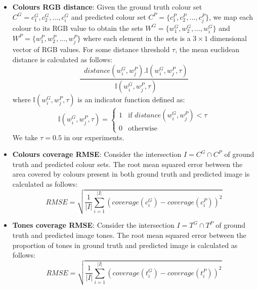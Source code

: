 \begin{itemize}
    \item \textbf{Colours RGB distance}: Given the ground truth colour set $C^G = {c_1^G, c_2^G, ..., c_i^G}$ and predicted colour set $C^P = \{c_1^P, c_2^P, ..., c_j^P\}$, we map each colour to its RGB value to obtain the sets $W^G = \{w_1^G, w_2^G, ..., w_i^G\}$ and $W^P = \{w_1^P, w_2^P, ..., w_j^P\}$ where each element in the sets is a $3\times1$ dimensional vector of RGB values. For some distance threshold $\tau$, the mean euclidean distance is calculated as follows:
    \begin{equation}
        \frac{\mathop{\sum_{i=1}^{|C^G|}\sum_{j=1}^{|C^P|}} distance(w_i^G, w_j^P).\mathbb{I}(w_i^G, w_j^P, \tau)}{\mathop{\sum_{i=1}^{|C^G|}\sum_{j=1}^{|C^P|}} \mathbb{I}(w_i^G, w_j^P, \tau) }
    \end{equation}
    where $\mathbb{I}(w_i^G, w_j^P, \tau)$ is an indicator function defined as:
    \begin{equation}
        \mathbb{I}(w_i^G, w_j^P, \tau) =
    \begin{cases}
        1 & \text{if } distance(w_i^G, w_j^P) < \tau\\
        0 & \text{otherwise}
    \end{cases}
    \end{equation}
    We take $\tau = 0.5$ in our experiments.
    
    \item \textbf{Colours coverage RMSE}: Consider the intersection $I = C^G \cap C^P$ of ground truth and predicted colour sets. The root mean squared error between the area covered by colours present in both ground truth and predicted image is calculated as follows:
    \begin{equation}
        RMSE = \sqrt{\frac{1}{|I|}\sum_{i=1}^{|I|}(coverage(c_i^G) - coverage(c_i^P))^2}
    \end{equation}

    \item \textbf{Tones coverage RMSE}: Consider the intersection $I = T^G \cap T^P$ of ground truth and predicted image tones. The root mean squared error between the proportion of tones in ground truth and predicted image is calculated as follows:
    \begin{equation}
        RMSE = \sqrt{\frac{1}{|I|}\sum_{i=1}^{|I|}(coverage(t_i^G) - coverage(t_i^P))^2}
    \end{equation}
    
    

\end{itemize}

